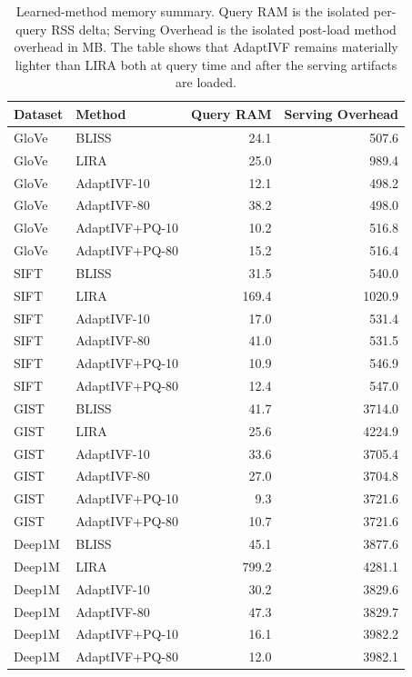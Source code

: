 \documentclass[sigconf]{acmart}
\begin{document}
\begin{table}[!htbp]
  \centering
  \scriptsize
  \setlength{\tabcolsep}{4pt}
  \caption{Learned-method memory summary. Query RAM is the isolated per-query RSS delta; Serving Overhead is the isolated post-load method overhead in MB. The table shows that AdaptIVF remains materially lighter than LIRA both at query time and after the serving artifacts are loaded.}
  \label{tab:appendix:memory}
  \begin{tabular}{llrr}
    \toprule
    Dataset & Method & Query RAM & Serving Overhead \\
    \midrule
    GloVe & BLISS & 24.1 & 507.6 \\
    GloVe & LIRA & 25.0 & 989.4 \\
    GloVe & AdaptIVF-10 & 12.1 & 498.2 \\
    GloVe & AdaptIVF-80 & 38.2 & 498.0 \\
    GloVe & AdaptIVF+PQ-10 & 10.2 & 516.8 \\
    GloVe & AdaptIVF+PQ-80 & 15.2 & 516.4 \\
    \midrule
    SIFT & BLISS & 31.5 & 540.0 \\
    SIFT & LIRA & 169.4 & 1020.9 \\
    SIFT & AdaptIVF-10 & 17.0 & 531.4 \\
    SIFT & AdaptIVF-80 & 41.0 & 531.5 \\
    SIFT & AdaptIVF+PQ-10 & 10.9 & 546.9 \\
    SIFT & AdaptIVF+PQ-80 & 12.4 & 547.0 \\
    \midrule
    GIST & BLISS & 41.7 & 3714.0 \\
    GIST & LIRA & 25.6 & 4224.9 \\
    GIST & AdaptIVF-10 & 33.6 & 3705.4 \\
    GIST & AdaptIVF-80 & 27.0 & 3704.8 \\
    GIST & AdaptIVF+PQ-10 & 9.3 & 3721.6 \\
    GIST & AdaptIVF+PQ-80 & 10.7 & 3721.6 \\
    \midrule
    Deep1M & BLISS & 45.1 & 3877.6 \\
    Deep1M & LIRA & 799.2 & 4281.1 \\
    Deep1M & AdaptIVF-10 & 30.2 & 3829.6 \\
    Deep1M & AdaptIVF-80 & 47.3 & 3829.7 \\
    Deep1M & AdaptIVF+PQ-10 & 16.1 & 3982.2 \\
    Deep1M & AdaptIVF+PQ-80 & 12.0 & 3982.1 \\
    \bottomrule
  \end{tabular}
\end{table}
\end{document}

